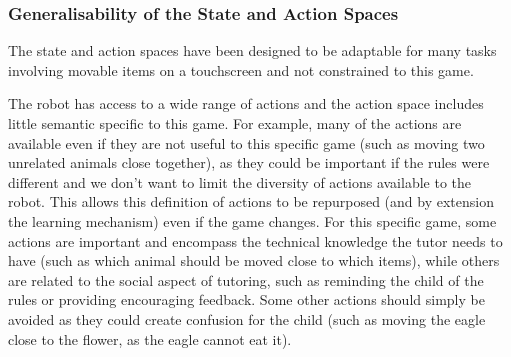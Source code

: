 

\subsubsection{Generalisability of the State and Action Spaces} \label{sec:tuto_general}

The state and action spaces have been designed to be adaptable for many tasks involving movable items on a touchscreen and not constrained to this game. 

The robot has access to a wide range of actions and the action space includes little semantic specific to this game. For example, many of the actions are available even if they are not useful to this specific game (such as moving two unrelated animals close together), as they could be important if the rules were different and we don't want to limit the diversity of actions available to the robot. This allows this definition of actions to be repurposed (and by extension the learning mechanism) even if the game changes. For this specific game, some actions are important and encompass the technical knowledge the tutor needs to have (such as which animal should be moved close to which items), while others are related to the social aspect of tutoring, such as reminding the child of the rules or providing encouraging feedback. Some other actions should simply be avoided as they could create confusion for the child (such as moving the eagle close to the flower, as the eagle cannot eat it). 

